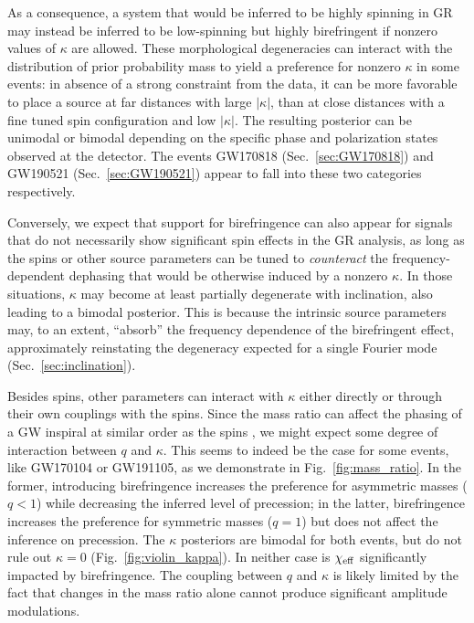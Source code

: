 \documentclass[aps,prd,twocolumn,superscriptaddress,preprintnumbers,floatfix,nofootinbib]{revtex4-2}
\begin{document}
As a consequence, a system that would be inferred to be highly spinning in \ac{GR} may instead be inferred to be low-spinning but highly birefringent if nonzero values of $\kappa$ are allowed.
These morphological degeneracies can interact with the distribution of prior probability mass to yield a preference for nonzero $\kappa$ in some events: in absence of a strong constraint from the data, it can be more favorable to place a source at far distances with large $|\kappa|$, than at close distances with a fine tuned spin configuration and low $|\kappa|$.
The resulting posterior can be unimodal or bimodal depending on the specific phase and polarization states observed at the detector.
The events GW170818 (Sec.~\ref{sec:GW170818}) and GW190521 (Sec.~\ref{sec:GW190521}) appear to fall into these two categories respectively.

Conversely, we expect that support for birefringence can also appear for signals that do not necessarily show significant spin effects in the \ac{GR} analysis, as long as the spins or other source parameters can be tuned to \emph{counteract} the frequency-dependent dephasing that would be otherwise induced by a nonzero $\kappa$.
In those situations, $\kappa$ may become at least partially degenerate with inclination, also leading to a bimodal posterior.
This is because the intrinsic source parameters may, to an extent, ``absorb'' the frequency dependence of the birefringent effect, approximately reinstating the degeneracy expected for a single Fourier mode (Sec.~\ref{sec:inclination}).

Besides spins, other parameters can interact with $\kappa$ either directly or through their own couplings with the spins.
Since the mass ratio can affect the phasing of a \ac{GW} inspiral at similar order as the spins \cite{Blanchet:2013haa}, we might expect some degree of interaction between $q$ and $\kappa$.
This seems to indeed be the case for some events, like GW170104 or GW191105, as we demonstrate in Fig.~\ref{fig:mass_ratio}.
In the former, introducing birefringence increases the preference for asymmetric masses ($q < 1$) while decreasing the inferred level of precession; in the latter, birefringence increases the preference for symmetric masses ($q = 1$) but does not affect the inference on precession.
The $\kappa$ posteriors are bimodal for both events, but do not rule out $\kappa = 0$ (Fig.~\ref{fig:violin_kappa}).
In neither case is $\chi_{\rm eff}$ significantly impacted by birefringence.
The coupling between $q$ and $\kappa$ is likely limited by the fact that changes in the mass ratio alone cannot produce significant amplitude modulations.
\end{document}
